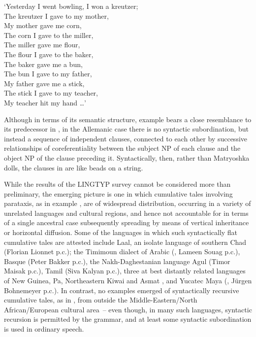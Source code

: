 \documentclass[output=paper]{langscibook}
\begin{document}
`Yesterday I went bowling, I won a kreutzer;\\
The kreutzer I gave to my mother, \\
My mother gave me corn, \\
The corn I gave to the miller, \\
The miller gave me flour, \\
The flour I gave to the baker, \\
The baker gave me a bun, \\
The bun I gave to my father, \\
My father gave me a stick, \\
The stick I gave to my teacher, \\
My teacher hit my hand  \ldots' \\

\z

Although in terms of its semantic structure, example  bears a close resemblance to its predecessor in , in the Allemanic case there is no syntactic subordination, but instead a sequence of independent clauses, connected to each other by successive relationships of coreferentiality between the subject NP of each clause and the object NP of the clause preceding it.  Syntactically, then, rather than Matryoshka dolls, the clauses in  are like beads on a string.

While the results of the LINGTYP survey cannot be considered more than preliminary, the emerging picture is one in which cumulative tales involving parataxis, as in example , are of widespread distribution, occurring in a variety of unrelated languages and cultural regions, and hence not accountable for in terms of a single ancestral case subsequently spreading by means of vertical inheritance or horizontal diffusion.  Some of the languages in which such syntactically flat cumulative tales are attested include Laal, an isolate language of southern Chad (Florian Lionnet p.c.); the Timimoun dialect of Arabic (\cite{mammeri1985ahellil}, Lameen Souag p.c.), Basque (Peter Bakker p.c.), the Nakh-Daghestanian language Agul (Timor Maisak p.c.), Tamil (Siva Kalyan p.c.), three at best distantly related languages of New Guinea, Pa, Northeastern Kiwai and Asmat \citep{voorhoeve2010remarkable}, and Yucatec Maya (\cite[180--186]{smailus1975textos}, Jürgen Bohnemeyer p.c.).  In contrast, no examples emerged of syntactically recursive cumulative tales, as in , from outside the Middle-Eastern\slash North African\slash European cultural area~– even though, in many such languages, syntactic recursion is permitted by the grammar, and at least some syntactic subordination is used in ordinary speech.  
\end{document}
